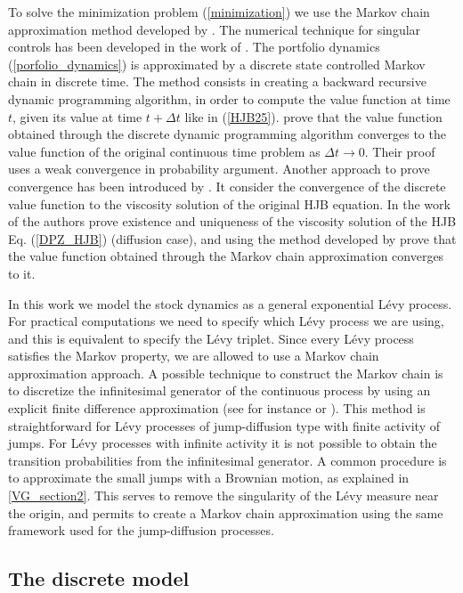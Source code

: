 To solve the minimization problem (\ref{minimization}) we use the Markov chain approximation method developed by \cite{Kushner}.
The numerical technique for singular controls has been developed in the work of \cite{MaKu91}.
The portfolio dynamics (\ref{porfolio_dynamics}) is approximated by a discrete state controlled Markov chain in discrete time. 
The method consists in creating a backward recursive 
dynamic programming algorithm, in order to compute the value function at time $t$, given its value at time $t+\Delta t$ like in (\ref{HJB25}).
\cite{Kushner} prove that the value function obtained through the discrete dynamic programming algorithm converges to 
the value function of the original continuous time problem as $\Delta t \to 0$. 
Their proof uses a weak convergence in probability argument.
Another approach to prove convergence has been introduced by \cite{BaSo91}. It consider the convergence of the discrete value function to the viscosity solution of the 
original HJB equation.
In the work of \cite{DaPaZa93} the authors prove existence and uniqueness of the viscosity solution
of the HJB Eq. (\ref{DPZ_HJB}) (diffusion case), and using the method developed by \cite{BaSo91} prove 
that the value function obtained through the Markov chain approximation converges to it.

In this work we model the stock dynamics as a general exponential Lévy process. For practical computations we need to specify
which Lévy process we are using, and this is equivalent to specify the Lévy triplet.
Since every L\'evy process satisfies the Markov property, we are allowed to use a Markov chain approximation approach.  
A possible technique to construct the Markov chain is to discretize the infinitesimal generator of the continuous process by using an explicit finite difference approximation
(see for instance \cite{Kushner} or \cite{FlemingSoner}).
This method is straightforward for 
Lévy processes of jump-diffusion type with finite activity of jumps. 
For Lévy processes with infinite activity it is not possible to obtain the transition probabilities from the infinitesimal generator.
A common procedure is to approximate the small jumps with a Brownian motion, as explained in \ref{VG_section2}. This serves to remove
the singularity of the Lévy measure near the origin, and permits to create a Markov chain approximation using the same framework used for the jump-diffusion processes.



\subsection{The discrete model}\label{discrete_model}

